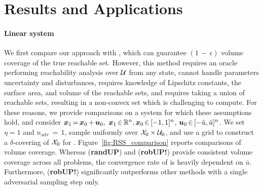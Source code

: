 \documentclass{article}
\begin{document}
\section{Results and Applications}\label{sec:result}




\vspace{-2mm}\paragraph{Linear system} We first compare our approach with \citep{LiebenweinRSS2018}, which can guarantee $(1\,{-}\,\epsilon)$ volume coverage of the true reachable set. However, this method requires an oracle performing reachability analysis over $\mathcal{U}$ from any state, cannot handle parameters uncertainty and disturbances, requires knowledge of Lipschitz constants, the surface area, and volume of the reachable sets, and requires taking a union of reachable sets, resulting in a non-convex set which is challenging to compute. For these reasons, we provide comparisons on a system for which these assumptions hold, and consider $\bm{x}_1\,{=}\,\bm{x}_0\,{+}\,\bm{u}_0, \ \bm{x}_1\,{\in}\,\mathbb{R}^n, \bm{x}_0\,{\in}\,[-1,1]^n$, $\bm{u}_0\,{\in}\, [-\bar{u},\bar{u}]^n$. We set $\eta = 1$ and $n_{\textrm{adv}}\,{=}\,1$, sample uniformly over $\mathcal{X}_0 \times \mathcal{U}_0$, and use a grid to construct a $\delta$-covering of $\mathcal{X}_0$ for \citep{LiebenweinRSS2018}. Figure~\ref{fig:RSS_comparison} reports comparisons of volume coverage. Whereas (\textbf{randUP}) and (\textbf{robUP!}) provide consistent volume coverage across all problems, the convergence rate of \citep{LiebenweinRSS2018} %
is heavily dependent on $\bar{u}$. Furthermore, (\textbf{robUP!}) significantly outperforms other methods with a single adversarial sampling step only. 
\end{document}
